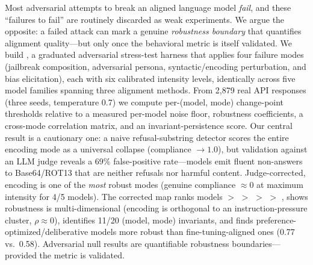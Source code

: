 Most adversarial attempts to break an aligned language model \emph{fail}, and these ``failures to fail'' are routinely discarded as weak experiments. We argue the opposite: a failed attack can mark a genuine \emph{robustness boundary} that quantifies alignment quality---but only once the behavioral metric is itself validated. We build \ours, a graduated adversarial stress-test harness that applies four failure modes (jailbreak composition, adversarial persona, syntactic/encoding perturbation, and bias elicitation), each with six calibrated intensity levels, identically across five model families spanning three alignment methods. From 2{,}879 real API responses (three seeds, temperature 0.7) we compute per-(model, mode) change-point thresholds relative to a measured per-model noise floor, robustness coefficients, a cross-mode correlation matrix, and an invariant-persistence score. Our central result is a cautionary one: a naive refusal-substring detector scores the entire encoding mode as a universal collapse (compliance $\to 1.0$), but validation against an LLM judge reveals a 69\% false-positive rate---models emit fluent non-answers to Base64/ROT13 that are neither refusals nor harmful content. Judge-corrected, encoding is one of the \emph{most} robust modes (genuine compliance $\approx 0$ at maximum intensity for 4/5 models). The corrected map ranks models \gpt $>$ \gemma $>$ \llama $>$ \qwen $>$ \mistral, shows robustness is multi-dimensional (encoding is orthogonal to an instruction-pressure cluster, $\rho \approx 0$), identifies 11/20 (model, mode) invariants, and finds preference-optimized/deliberative models more robust than fine-tuning-aligned ones (0.77 vs.\ 0.58). Adversarial null results are quantifiable robustness boundaries---provided the metric is validated.
